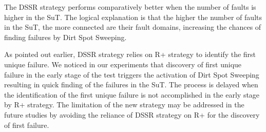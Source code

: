 \documentclass[conference]{IEEEtran}
\begin{document}
The DSSR strategy performs comparatively better when the number of faults is higher in the SuT. The logical explanation is that the higher the number of faults in the SuT, the more connected are their fault domains, increasing the chances of finding failures by Dirt Spot Sweeping.

As pointed out earlier, DSSR strategy relies on R+ strategy to identify the first unique failure. We noticed in our experiments that discovery of first unique failure in the early stage of the test triggers the activation of Dirt Spot Sweeping resulting in quick finding of the failures in the SuT. The process is delayed when the identification of the first unique failure is not accomplished in the early stage by R+ strategy. The limitation of the new strategy may be addressed in the future studies by avoiding the reliance of DSSR strategy on R+ for the discovery of first failure.





\end{document}
